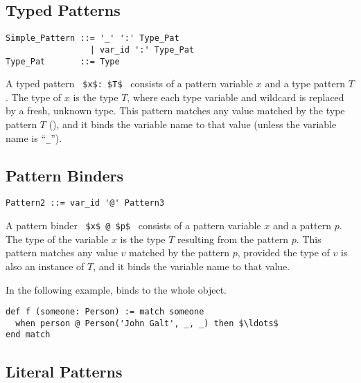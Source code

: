 \subsection{Typed Patterns}
\label{sec:typed-patterns}

\syntax\begin{lstlisting}
Simple_Pattern ::= '_' ':' Type_Pat
                 | var_id ':' Type_Pat
Type_Pat       ::= Type
\end{lstlisting}

A typed pattern ~\lstinline!$x$: $T$!~ consists of a pattern variable $x$ and a type pattern $T$. The type of $x$ is the type $T$, where each type variable and wildcard is replaced by a fresh, unknown type. This pattern matches any value matched by the type pattern $T$ (), and it binds the variable name to that value (unless the variable name is ``\lstinline!_!''). 






\subsection{Pattern Binders}
\label{sec:pattern-binders}

\syntax\begin{lstlisting}
Pattern2 ::= var_id '@' Pattern3
\end{lstlisting}

A pattern binder ~\lstinline!$x$ @ $p$!~ consists of a pattern variable $x$ and a pattern $p$. The type of the variable $x$ is the type $T$ resulting from the pattern $p$. This pattern matches any value $v$ matched by the pattern $p$, provided the type of $v$ is also an instance of $T$, and it binds the variable name to that value. 

\example In the following example,  binds to the whole  object. 
\begin{lstlisting}
def f (someone: Person) := match someone
  when person @ Person('John Galt', _, _) then $\ldots$
end match
\end{lstlisting}







\subsection{Literal Patterns}
\label{sec:literal-patterns}

